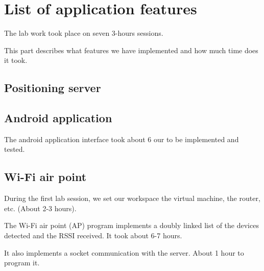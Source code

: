 \section{List of application features}

The lab work took place on seven 3-hours sessions.

This part describes what features we have implemented and how much time does it
took.

\subsection{Positioning server}


\subsection{Android application}

The android application interface took about 6 our to be implemented and tested.


\subsection{Wi-Fi air point}

During the first lab session, we set our workspace the virtual machine, 
the router, etc. (About 2-3 hours).

The Wi-Fi air point (AP) program implements a doubly linked list of the devices
detected and the RSSI received. It took about 6-7 hours.

It also implements a socket communication with the server. About 1 hour to
program it.





